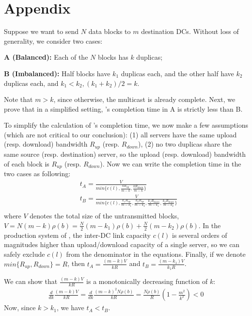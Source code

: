 \section{Appendix}
\label{sec:appendix}
Suppose we want to send $N$ data blocks to $m$ destination DCs. Without
loss of generality, we consider two cases:
\begin{packeditemize}
\item {\bf A (Balanced):} Each of the $N$ blocks has $k$ duplicas;
\item {\bf B (Imbalanced):} Half blocks have $k_1$ duplicas each, and the
other half have $k_2$ duplicas each, and $k_1<k_2, (k_1+k_2)/2=k$.
\end{packeditemize}
Note that $m>k$, since otherwise, the multicast is already complete.
Next, we prove that in a simplified setting, \name's completion time in A
is strictly less than B.

To simplify the calculation of \name's completion time, we now make a few
assumptions (which are not critical to our conclusion): (1) all servers
have the same upload (resp. download) bandwidth $R_{up}$ (resp. $R_{down}$),
(2) no two duplicas share the same source (resp. destination) server, so
the upload (resp. download) bandwidth of each block is $R_{up}$ (resp.
$R_{down}$).
Now we can write the completion time in the two cases as following:
\begin{equation}
\label{equa:caseK}
\begin{split}
& t_A = \frac{V}{min\{c(l),\frac{k R_{up}}{m-k},
\frac{k R_{down}}{m-k}\}}\\
& t_B = \frac{V}{min\{c(l),
\frac{k_1 R_{up}}{m-k_1},
\frac{k_2 R_{up}}{m-k_2},
\frac{k_1 R_{down}}{m-k_1},
\frac{k_2 R_{down}}{m-k_2}\}}\\
\end{split}
\end{equation}
where $V$ denotes the total size of the untransmitted blocks,
$V=N(m-k)\rho(b)=
\frac{N}{2}(m-k_1)\rho(b)+\frac{N}{2}(m-k_2) \rho(b)$.
In the production system of \company, the inter-DC link capacity $c(l)$ is
several orders of magnitudes higher than upload/download capacity of a
single server, so we can safely exclude $c(l)$ from the denominator in the
equations.
Finally, if we denote $min\{R_{up},R_{down}\}=R$, then
$t_A=\frac{(m-k)V}{k R}$ and
$t_B=\frac{(m-k_1)V}{k_1 R}$.

We can show that $\frac{(m-k)V}{k R}$ is a monotonically decreasing
function of $k$:
\begin{equation}
\label{calculus}
\begin{split}
\frac{d}{dk}\frac{(m-k)V}{k R}
=\frac{d}{dk}\frac{(m-k)^2N\rho(b)}{k R}
=\frac{N \rho(b)}{R}  (1-\frac{m^2}{k^2})<0
\end{split}
\end{equation}
Now, since $k>k_1$, we have $t_A<t_B$.

